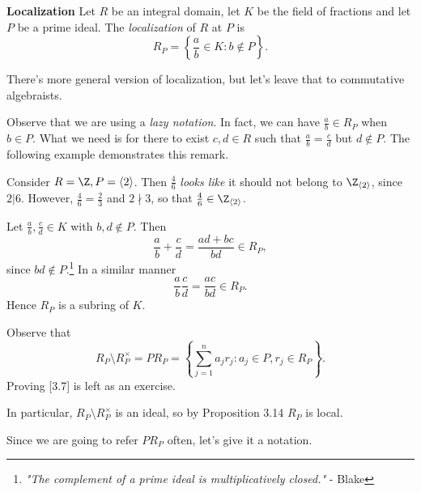 \documentclass[pmath441]{subfiles}
\begin{document}
    \begin{definition}{\textbf{Localization}}
        Let $R$ be an integral domain, let $K$ be the field of fractions and let $P$ be a prime ideal. The \emph{localization} of $R$ at $P$ is
        \begin{equation*}
            R_P = \left\lbrace \frac{a}{b}\in K: b\notin P \right\rbrace.
        \end{equation*}
    \end{definition}

    \np There's more general version of localization, but let's leave that to commutative algebraists.

    \np Observe that we are using a \textit{lazy notation}. In fact, we can have $\frac{a}{b}\in R_P$ when $b\in P$. What we need is for there to exist $c,d\in R$ such that $\frac{a}{b} = \frac{c}{d}$ but $d\notin P$. The following example demonstrates this remark.

    \begin{example}{}
        Consider $R=\Z,P=\left< 2 \right>$. Then $\frac{4}{6}$ \textit{looks like} it should not belong to $\Z_{\left< 2 \right>}$, since $2|6$. However, $\frac{4}{6} = \frac{2}{3}$ and $2\nmid 3$, so that $\frac{4}{6}\in \Z_{\left< 2 \right>}$.
    \end{example}

    \rruleline

    \np Let $\frac{a}{b}, \frac{c}{d}\in K$ with $b,d\notin P$. Then
    \begin{equation*}
        \frac{a}{b}+\frac{c}{d} = \frac{ad+bc}{bd}\in R_P,
    \end{equation*}
    since $bd\notin P$.\footnote{\textit{"The complement of a prime ideal is multiplicatively closed."} - Blake} In a similar manner
    \begin{equation*}
        \frac{a}{b} \frac{c}{d} = \frac{ac}{bd}\in R_P.
    \end{equation*}
    Hence $R_P$ is a subring of $K$.
    
    \np Observe that
    \begin{equation}
        R_P \setminus R_P^{\times} = PR_P = \left\lbrace \sum^{n}_{j=1}a_jr_j: a_j\in P, r_j\in R_P \right\rbrace.
    \end{equation}
    Proving [3.7] is left as an exercise.

    In particular, $R_P\setminus R_P^{\times}$ is an ideal, so by Proposition 3.14 $R_P$ is local.

    \np Since we are going to refer $PR_P$ often, let's give it a notation.
\end{document}
